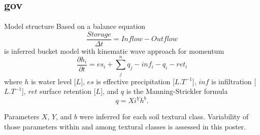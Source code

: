 \subsection{gov}
\begin{block}{Model structure}
    Based on a balance equation 
    $$
        \frac{Storage}{\Delta t} = \nonumber  
        Inflow - Outflow
    $$
    is inferred bucket model with kinematic wave approach for momentum 
    $$
        \frac{\partial h_{i}}{\partial t} =  es_{i} + \sum_j^n q_{j} - inf_{i} - q_{i} - ret_i
    $$
    where $h$ is water level [$L$], $es$ is effective precipitation [$L.T^{-1}$], $inf$ is infiltration [$L.T^{-1}$], $ret$ surface retention [$L$], and $q$ is the Manning-Strickler formula
    \begin{equation}
      q = Xi^Yh^b. 
      \label{eq:manning}
    \end{equation}

    Parameters $X$, $Y$, and $b$ were inferred for each soil textural class. Variability of those parameters within and among textural classes is assessed in this poster. 
\end{block}





